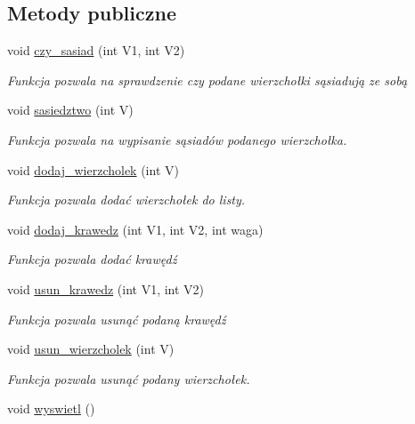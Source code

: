 \subsection*{\-Metody publiczne}
\begin{DoxyCompactItemize}
\item 
void \hyperlink{class_graf_af6a4f39972b6986f6cb16c034ad3b5a2}{czy\-\_\-sasiad} (int \-V1, int \-V2)
\begin{DoxyCompactList}\small\item\em \-Funkcja pozwala na sprawdzenie czy podane wierzchołki sąsiadują ze sobą \end{DoxyCompactList}\item 
void \hyperlink{class_graf_a5febb3067d14f40df0f8bdadd76b12f9}{sasiedztwo} (int \-V)
\begin{DoxyCompactList}\small\item\em \-Funkcja pozwala na wypisanie sąsiadów podanego wierzchołka. \end{DoxyCompactList}\item 
void \hyperlink{class_graf_a062352d1e08dd505152ba042d824b561}{dodaj\-\_\-wierzcholek} (int \-V)
\begin{DoxyCompactList}\small\item\em \-Funkcja pozwala dodać wierzchołek do listy. \end{DoxyCompactList}\item 
void \hyperlink{class_graf_ad5550f6b3a7d63f78685366814cb4c84}{dodaj\-\_\-krawedz} (int \-V1, int \-V2, int waga)
\begin{DoxyCompactList}\small\item\em \-Funkcja pozwala dodać krawędź \end{DoxyCompactList}\item 
void \hyperlink{class_graf_a1c64da7079c6b41e13484f4170b02cb8}{usun\-\_\-krawedz} (int \-V1, int \-V2)
\begin{DoxyCompactList}\small\item\em \-Funkcja pozwala usunąć podaną krawędź \end{DoxyCompactList}\item 
void \hyperlink{class_graf_a3e9fe0a7d22f2bad4a3d5fd325acfda1}{usun\-\_\-wierzcholek} (int \-V)
\begin{DoxyCompactList}\small\item\em \-Funkcja pozwala usunąć podany wierzchołek. \end{DoxyCompactList}\item 
void \hyperlink{class_graf_a3a084b33cfcfa17bbfc05570043aaab2}{wyswietl} ()

\end{DoxyCompactItemize}
